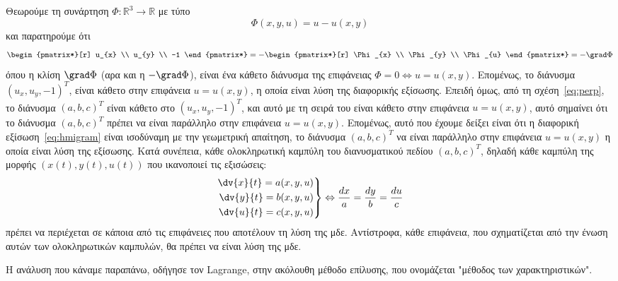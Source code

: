Θεωρούμε τη συνάρτηση $ \Phi \colon \mathbb{R}^{3} \to \mathbb{R} $ με τύπο 
\[
  \Phi(x,y,u)=u-u(x,y) 
\] 
και παρατηρούμε ότι 
\[
  \begin{pmatrix*}[r] u_{x} \\ u_{y} \\ -1 \end{pmatrix*} = -
  \begin{pmatrix*}[r] \Phi _{x} \\ \Phi _{y} \\ \Phi _{u} \end{pmatrix*} = 
  - \grad \Phi 
\]
όπου η κλίση $ \grad \Phi $ (αρα και η $ - \grad \Phi $), είναι ένα κάθετο διάνυσμα 
της επιφάνειας $ \Phi = 0 \Leftrightarrow u=u(x,y) $. Επομένως, το διάνυσμα 
$ (u_{x},u_{y},-1)^{T} $, είναι κάθετο στην επιφάνεια $ u=u(x,y) $, η οποία είναι 
λύση της διαφορικής εξίσωσης.
Επειδή όμως, από τη σχέση~\eqref{eq:perp}, το διάνυσμα $ (a,b,c)^{T} $ 
είναι κάθετο στο $ (u_{x},u_{y},-1)^{T} $, και αυτό με τη σειρά του είναι κάθετο 
στην επιφάνεια $ u=u(x,y) $, αυτό σημαίνει ότι το διάνυσμα 
$ (a,b,c)^{T} $ πρέπει να είναι παράλληλο στην επιφάνεια $ u=u(x,y) $. Επομένως, 
αυτό που έχουμε δείξει είναι ότι η διαφορική εξίσωση~\eqref{eq:hmigram} είναι 
ισοδύναμη με την γεωμετρική απαίτηση, το διάνυσμα $ (a,b,c)^{T} $ να είναι παράλληλο
στην επιφάνεια $ u=u(x,y) $ η οποία είναι λύση της εξίσωσης. 
Κατά συνέπεια, κάθε ολοκληρωτική καμπύλη του διανυσματικού πεδίου $ (a,b,c)^{T} $,
δηλαδή κάθε καμπύλη της μορφής $ (x(t),y(t),u(t)) $ που ικανοποιεί τις εξισώσεις:
\[
  \left.
    \begin{aligned}
  \dv{x}{t} = a(x,y,u) \\
  \dv{y}{t} = b(x,y,u) \\
  \dv{u}{t} = c(x,y,u) 
    \end{aligned} 
  \right\} \Leftrightarrow 
  \frac{dx}{a} = \frac{dy}{b} = \frac{du}{c}
 \]
πρέπει να περιέχεται σε κάποια από τις επιφάνειες που αποτέλουν τη λύση της μδε. 
Αντίστροφα, κάθε επιφάνεια, που σχηματίζεται από την ένωση αυτών των ολοκληρωτικών καμπυλών, θα πρέπει να είναι λύση της μδε.

Η ανάλυση που κάναμε παραπάνω, οδήγησε τον Lagrange, στην ακόλουθη μέθοδο επίλυσης, 
που ονομάζεται "μέθοδος των χαρακτηριστικών". 

